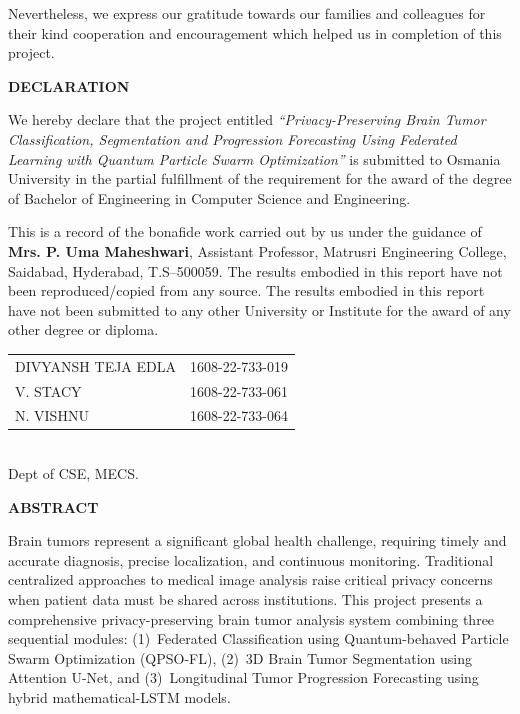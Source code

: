 \documentclass[12pt,a4paper,oneside]{report}
\newcommand{\projecttitle}{Privacy-Preserving Brain Tumor Classification, Segmentation and Progression Forecasting Using Federated Learning with Quantum Particle Swarm Optimization}
\newcommand{\guidename}{Mrs. P. Uma Maheshwari}
\newcommand{\guidetitle}{Assistant Professor}
\newcommand{\collegename}{Matrusri Engineering College}
\newcommand{\collegeaddr}{Saidabad, Hyderabad, T.S--500059}
\begin{document}
Nevertheless, we express our gratitude towards our families and colleagues for their kind cooperation and encouragement which helped us in completion of this project.

\newpage
\begin{center}
{\Large\bfseries DECLARATION}\\[1cm]
\end{center}

We hereby declare that the project entitled \textit{``\projecttitle''} is submitted to Osmania University in the partial fulfillment of the requirement for the award of the degree of Bachelor of Engineering in Computer Science and Engineering.

This is a record of the bonafide work carried out by us under the guidance of \textbf{\guidename}, \guidetitle, \collegename, \collegeaddr. The results embodied in this report have not been reproduced/copied from any source. The results embodied in this report have not been submitted to any other University or Institute for the award of any other degree or diploma.

\vspace{3cm}
\begin{center}
\begin{tabular}{ll}
DIVYANSH TEJA EDLA & 1608-22-733-019\\
V. STACY           & 1608-22-733-061\\
N. VISHNU          & 1608-22-733-064\\
\end{tabular}\\[0.5cm]
Dept of CSE, MECS.
\end{center}

\newpage
\begin{center}
{\Large\bfseries ABSTRACT}\\[1cm]
\end{center}

Brain tumors represent a significant global health challenge, requiring timely and accurate diagnosis, precise localization, and continuous monitoring. Traditional centralized approaches to medical image analysis raise critical privacy concerns when patient data must be shared across institutions. This project presents a comprehensive privacy-preserving brain tumor analysis system combining three sequential modules: (1)~Federated Classification using Quantum-behaved Particle Swarm Optimization (QPSO-FL), (2)~3D Brain Tumor Segmentation using Attention U-Net, and (3)~Longitudinal Tumor Progression Forecasting using hybrid mathematical-LSTM models.
\end{document}
